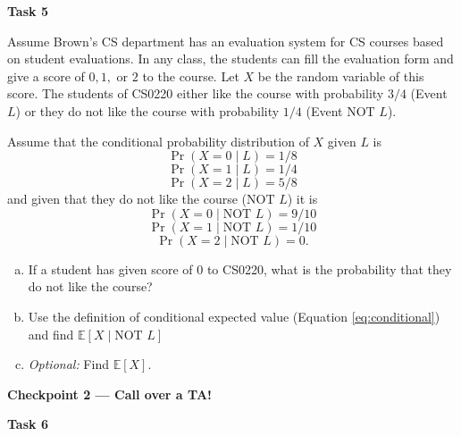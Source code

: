 \documentclass[12pt,letterpaper]{article}
\newenvironment{22enumerate}{\begin{enumerate}[a.]\itemsep0em}{\end{enumerate}}
\begin{document}
\textbf{Task 5}
\renewcommand{\neg}{\textrm{NOT }}


Assume Brown's CS department has an evaluation system for CS courses based on student evaluations. In any class, the students can fill the evaluation form and give a score of $0,1,$ or $2$ to the course.
Let $X$ be the random variable of this score. The students of CS0220 either like the course with probability $3/4$ (Event $L$) or they do not like the course with probability $1/4$ (Event $\neg L$).

Assume that the conditional probability distribution of $X$ given $L$ is $$\Pr(X=0\mid L)=1/8$$ $$\Pr(X=1\mid L)=1/4$$ $$\Pr(X=2\mid L)=5/8$$ and given that they do not like the course ($\neg L$) it is $$\Pr(X=0\mid\neg L)=9/10$$ $$\Pr(X=1\mid \neg L)=1/10$$ $$\Pr(X=2\mid \neg L)=0.$$
\begin{22enumerate}
    \item If a student has given score of 0 to CS0220, what is the probability that they do not like the course?
    \begin{mdframed} \vspace{1.5cm} \end{mdframed}

    \item  Use the definition of conditional expected value (Equation \ref{eq:conditional}) and find $\mathbb{E}[X\mid \neg L]$ 
    \begin{mdframed} \vspace{1.5cm} \end{mdframed}
    
    \item \textit{Optional:} Find $\mathbb{E}[X]$.
    \begin{mdframed} \vspace{1.5cm} \end{mdframed}

\end{22enumerate}

\textbf{Checkpoint 2 — Call over a TA!}

\newpage

\textbf{Task 6}
\end{document}
